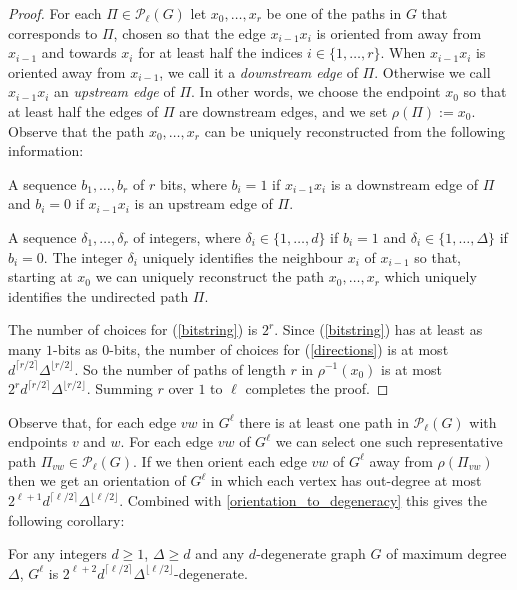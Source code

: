 \documentclass{patmorin}
\newcommand{\defin}[1]{\emph{\color{brightmaroon}#1}}
\begin{document}
\begin{proof}
  For each $\Pi\in\mathcal{P}_\ell(G)$ let $x_0,\ldots,x_r$ be one of the paths in $G$ that corresponds to $\Pi$, chosen so that the edge $x_{i-1}x_{i}$ is oriented from away from $x_{i-1}$ and towards $x_{i}$ for at least half the indices $i\in\{1,\ldots,r\}$.  When $x_{i-1}x_{i}$ is oriented away from $x_{i-1}$, we call it a \defin{downstream edge} of $\Pi$. Otherwise we call $x_{i-1}x_{i}$ an \defin{upstream edge} of $\Pi$. In other words, we choose the endpoint $x_0$ so that at least half the edges of $\Pi$ are downstream edges, and we set $\rho(\Pi):=x_0$.  Observe that the path $x_0,\ldots,x_r$ can be uniquely reconstructed from the following information:
  \begin{compactenum}[(a)]
    \item A sequence $b_1,\ldots,b_r$ of $r$ bits, where $b_i=1$ if $x_{i-1}x_i$ is a downstream edge of $\Pi$ and $b_i=0$ if $x_{i-1}x_i$ is an upstream edge of $\Pi$.\label{bitstring}
    \item A sequence $\delta_1,\ldots,\delta_r$ of integers, where $\delta_i\in\{1,\ldots,d\}$ if $b_i=1$ and $\delta_i\in\{1,\ldots,\Delta\}$ if $b_i=0$.  The integer $\delta_i$ uniquely identifies the neighbour $x_i$ of $x_{i-1}$ so that, starting at $x_0$ we can uniquely reconstruct the path $x_0,\ldots,x_r$ which uniquely identifies the undirected path $\Pi$.\label{directions}
  \end{compactenum}
  The number of choices for (\ref{bitstring}) is $2^r$.  Since (\ref{bitstring}) has at least as many $1$-bits as $0$-bits, the number of choices for (\ref{directions}) is at most $d^{\lceil r/2\rceil}\Delta^{\lfloor r/2\rfloor}$.  So the number of paths of length $r$ in $\rho^{-1}(x_0)$ is at most $2^rd^{\lceil r/2\rceil}\Delta^{\lfloor r/2\rfloor}$.  Summing $r$ over $1$ to $\ell$ completes the proof.
\end{proof}

Observe that, for each edge $vw$ in $G^{\ell}$ there is at least one path in $\mathcal{P}_\ell(G)$ with endpoints $v$ and $w$.  For each edge $vw$ of $G^{\ell}$ we can select one such representative path $\Pi_{vw}\in\mathcal{P}_\ell(G)$.  If we then orient each edge $vw$ of $G^{\ell}$ away from $\rho(\Pi_{vw})$ then we get an orientation of $G^{\ell}$ in which each vertex has out-degree at most $2^{\ell+1}d^{\lceil \ell/2\rceil}\Delta^{\lfloor\ell/2\rfloor}$.  Combined with \cref{orientation_to_degeneracy} this gives the following corollary:

\begin{cor}\label{degeneracy_of_g_l}
  For any integers $d\ge 1$, $\Delta\ge d$ and any $d$-degenerate graph $G$ of maximum degree $\Delta$, $G^{\ell}$ is $2^{\ell+2}d^{\lceil \ell/2\rceil}\Delta^{\lfloor\ell/2\rfloor}$-degenerate.
\end{cor}
\end{document}
